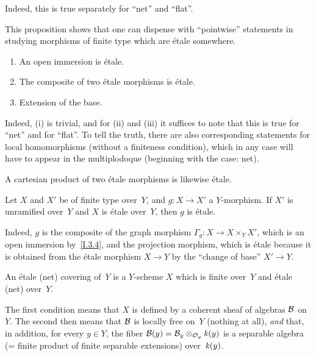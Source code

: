 Indeed, this is true separately for ``net'' and ``flat''.

This proposition shows that one can dispense with ``pointwise''
statements in studying morphisms of finite type which are \'etale
somewhere.

\begin{proposition}
\label{I.4.6}
\begin{enumerate}
\item[(i)] An open immersion is \'etale.
\item[(ii)] The composite of two \'etale morphisms is \'etale.
\item[(iii)] Extension of the base.
\end{enumerate}
\end{proposition}

Indeed, (i) is trivial, and for (ii) and (iii) it suffices to note
that this is true for ``net'' and for ``flat''. To tell the truth,
there are also corresponding statements for local homomorphisms
(without a finiteness condition), which in any case will have to
appear in the multiplodoque (beginning with the case: net).

\begin{corollary}
\label{I.4.7}
A cartesian product of two \'etale morphisms is likewise \'etale.
\end{corollary}

\begin{corollary}
\label{I.4.8}
Let $X$ and $X'$ be of finite type over~$Y$, and $g\colon X\to X'$
a $Y$-morphism. If $X'$ is unramified over~$Y$ and $X$ is \'etale
over~$Y$, then $g$ is \'etale.
\end{corollary}

Indeed, $g$ is the composite of the graph morphism
$\Gamma_g\colon X\to X\times_Y X'$, which is an open immersion
by~\ref{I.3.4}, and the projection morphism, which is \'etale
because it is obtained from the \'etale morphism $X\to Y$ by the
``change of base'' $X'\to Y$.

\begin{definition}
\label{I.4.9}
An \'etale (\resp net) covering of~$Y$ is a $Y$-scheme $X$ which
is finite over~$Y$ and \'etale (\resp net) over~$Y$.
\end{definition}

The first condition means that $X$ is defined by a coherent sheaf
of algebras $\cal{B}$ on~$Y$. The second then means that $\cal{B}$
is locally free on~$Y$ (\resp nothing at all), \emph{and} that,
in addition, for every $y\in Y$, the fiber
$\cal{B}(y)=\cal{B}_y\otimes_{\cal{O}_y}\kres(y)$ is a separable
algebra (= finite product of finite separable extensions)
over~$\kres(y)$.

